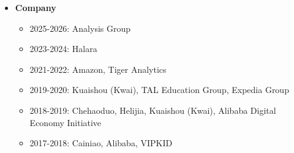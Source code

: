 \documentclass[10pt]{article}
\newenvironment{outerlist}[1][\enskip\textbullet]%
        {\begin{itemize}[#1,leftmargin=*]}{\end{itemize}%
         \vspace{-.6\baselineskip}}
\newenvironment{innerlist}[1][\enskip\textbullet]%
        {\begin{itemize}[#1,leftmargin=*,parsep=0pt,itemsep=0pt,topsep=0pt,partopsep=0pt]}
        {\end{itemize}}
\newcommand{\halfblankline}{\quad\vspace{-0.5\baselineskip}\pagebreak[3]}
\begin{document}
\begin{outerlist}
\begin{innerlist}
        \item 2017-2018: London Business School, Imperial College Business School, Massachusetts Institute of Technology, HKUST Business School, UCLA Management and Organization, Northwestern University, Kellogg School of Management, Cornell University, Harvard Business School, 
        \item 2016-2017: Washington University in St. Louis, University of Science and Technology of China, Fudan University School of Management, NYU Shanghai, HKUST Business School, Northwestern University, Kellogg School of Management,
        \item 2015-2016: Washington University in St. Louis, Carnegie Mellon University, Duke University, UNC Kenan-Flagler Business School, Indiana University, Yale School of Management, University of Michigan.
    \end{innerlist}
    
    \item {\bf Company}
    \begin{innerlist}
        \item 2025-2026: Analysis Group
        \item 2023-2024: Halara
        \item 2021-2022: Amazon, Tiger Analytics
        \item 2019-2020: Kuaishou (Kwai), TAL Education Group, Expedia Group
        \item 2018-2019: Chehaoduo, Helijia, Kuaishou (Kwai), Alibaba Digital Economy Initiative
        \item 2017-2018: Cainiao, Alibaba, VIPKID
    \end{innerlist}

\end{outerlist}

\halfblankline
\end{document}
